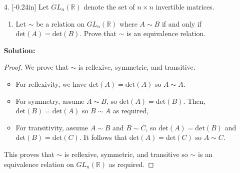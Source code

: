 \documentclass[letterpaper,12pt]{article}
\theoremstyle{definition}
\begin{document}
\pagebreak
\begin{enumerate}
    \item[4.] \reversemarginpar{}[-0.24in] Let $GL_n(\mathbb{R})$ denote the set of $n \times n$ invertible matrices. \begin{enumerate}
        \item Let $\sim$ be a relation on $GL_n(\mathbb{R})$ where $A \sim B$ if and only if $\mathrm{det}(A) = \mathrm{det}(B)$.  
 Prove that $\sim$ is an equivalence relation.
    \end{enumerate}
    \begin{mdframed}
        \textbf{Solution:} \begin{proof}
            We prove that $\sim$ is reflexive, symmetric, and transitive. \begin{itemize}
                \item For reflexivity, we have $\mathrm{det}(A) = \mathrm{det}(A)$ so $A \sim A$. 
                \item For symmetry, assume $A \sim B$, so $\mathrm{det}(A) = \mathrm{det}(B)$. Then, $\mathrm{det}(B) = \mathrm{det}(A)$ so $B \sim A$ as required,
                \item For transitivity, assume $A \sim B$ and $B \sim C$, so $\mathrm{det}(A) = \mathrm{det}(B)$ and $\mathrm{det}(B) = \mathrm{det}(C)$. It follows that $\mathrm{det}(A) = \mathrm{det}(C)$ so $A \sim C$.
            \end{itemize}
            This proves that $\sim$ is reflexive, symmetric, and transitive so $\sim$ is an equivalence relation on $GL_n(\mathbb{R})$ as required.
        \end{proof}
    \end{mdframed}
\end{enumerate}
\pagebreak
\end{document}
